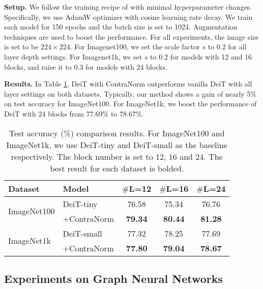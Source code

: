 \documentclass{article}
\theoremstyle{definition}
\theoremstyle{remark}
\theoremstyle{theorem}
\begin{document}
\textbf{Setup.} 
We follow the training recipe of \citet{touvron2021training} with minimal hyperparameter changes. Specifically, we use AdamW \citep{loshchilov2017decoupled} optimizer with cosine learning rate decay. We train each model for 150 epochs and the batch size is set to 1024. Augmentation techniques are used to boost the performance. For all experiments, the image size is set to be $224 \times 224$. For Imagenet100, we set the scale factor $s$ to 0.2 for all layer depth settings. For Imagenet1k, we set $s$ to 0.2 for models with 12 and 16 blocks, and raise it to 0.3 for models with 24 blocks.

\textbf{Results.} In Table \ref{table:vit-acc}, DeiT with ContraNorm outperforms vanilla DeiT with all layer settings on both datasets. Typically, our method shows a gain of nearly 5\% on test accuracy for ImageNet100. For ImageNet1k, we boost the performance of DeiT with 24 blocks from 77.69\% to 78.67\%.


\begin{table}[!t]
	\centering
	\caption{Test accuracy (\%) comparison results. For ImageNet100 and ImageNet1k, we use DeiT-tiny and DeiT-small as the baseline respectively. The block number is set to 12, 16 and 24. The best result for each dataset is bolded.}
	\vspace{-0.13 in}
	\begin{tabular}{ll ccc}
		\toprule
		Dataset & Model & $\#$L=12 & $\#$L=16 & $\#$L=24 \\
		\midrule
		\multirow{2}{*}{ImageNet100} & DeiT-tiny & 76.58 & 75.34 & 76.76 \\
		~ & +ContraNorm  & \bf79.34 & \bf80.44 & \bf81.28 \\
		\midrule
		\multirow{2}{*}{ImageNet1k} & DeiT-small & 77.32 & 78.25 & 77.69 \\
		~ & +ContraNorm & \bf77.80 & \bf79.04 & \bf78.67 \\
		\bottomrule    
	\end{tabular}
	\label{table:vit-acc}
 \vspace{-0.1 in}
\end{table}


\subsection{Experiments on Graph Neural Networks}
\end{document}
